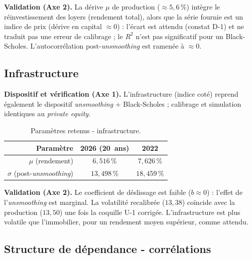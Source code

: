 \documentclass[11pt,a4paper]{article}
\renewcommand{\arraystretch}{1.4}
\newcommand{\tablehead}[1]{\textcolor{nxnavy}{\sffamily\bfseries\small #1}}
\begin{document}
\textbf{Validation (Axe 2).} La dérive $\mu$ de production ($\approx5{,}6\,\%$) intègre le réinvestissement des loyers (rendement total), alors que la série fournie est un indice de prix (dérive en capital $\approx0$) : l'écart est attendu (constat D-1) et ne traduit pas une erreur de calibrage ; le $R^2$ n'est pas significatif pour un Black-Scholes. L'autocorrélation post-\emph{unsmoothing} est ramenée à $\approx0$.

\subsection{Infrastructure}

\textbf{Dispositif et vérification (Axe 1).} L'infrastructure (indice coté) reprend également le dispositif \emph{unsmoothing} + Black-Scholes ; calibrage et simulation identiques au \emph{private equity}.

\begin{table}[H]
\centering\small
\renewcommand{\arraystretch}{1.4}\setlength{\tabcolsep}{6pt}
\begin{tabularx}{\linewidth}{R C C}
\toprule
\tablehead{Paramètre} & \tablehead{2026 (20~ans)} & \tablehead{2022} \\
\midrule
{} $\mu$ (rendement) & $6{,}516\,\%$ & $7{,}626\,\%$ \\
$\sigma$ (post-\emph{unsmoothing}) & $13{,}498\,\%$ & $18{,}459\,\%$ \\
\bottomrule
\end{tabularx}
\caption{Paramètres retenus - infrastructure.}
\end{table}

\textbf{Validation (Axe 2).} Le coefficient de déslissage est faible ($b\approx0$) : l'effet de l'\emph{unsmoothing} est marginal. La volatilité recalibrée ($13{,}38$) coïncide avec la production ($13{,}50$) une fois la coquille U-1 corrigée. L'infrastructure est plus volatile que l'immobilier, pour un rendement moyen supérieur, comme attendu.

\subsection{Structure de dépendance - corrélations}
\label{sec:correl}
\end{document}
